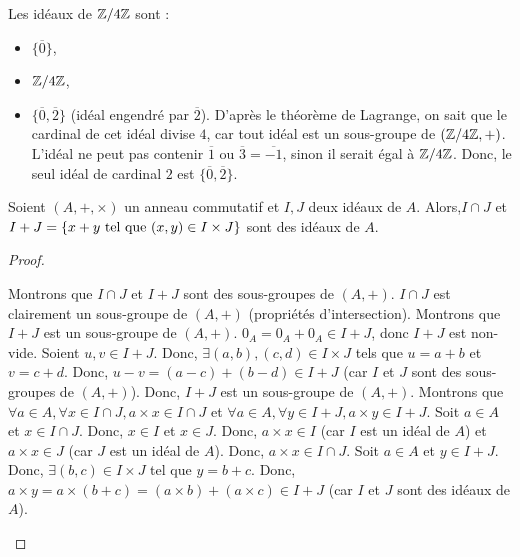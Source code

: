 \documentclass[12pt, a4paper]{report}
\begin{document}
\begin{example}
    Les idéaux de $\mathbb{Z}/4\mathbb{Z}$ sont :
    \begin{itemize}
        \item $\{\overline{0}\}$,
        \item $\mathbb{Z}/4\mathbb{Z}$,
        \item $\{\overline{0}, \overline{2}\}$ (idéal engendré par $\overline{2}$). D'après le théorème de Lagrange, on sait que le cardinal de cet idéal divise $4$, car tout idéal est un sous-groupe de $(\mathbb{Z}/4\mathbb{Z},+)$. L'idéal ne peut pas contenir $\overline{1}$ ou $\overline{3}=\overline{-1}$, sinon il serait égal à $\mathbb{Z}/4\mathbb{Z}$. Donc, le seul idéal de cardinal $2$ est $\{\overline{0}, \overline{2}\}$.
    \end{itemize}
\end{example}

\begin{property}
    Soient $(A,+,\times)$ un anneau commutatif et $I,J$ deux idéaux de $A$. Alors,$I\cap J$ et $I + J = \{x + y \text{ tel que } (x,y) \in I \times J\}$ sont des idéaux de $A$.
\end{property}

\begin{proof}
    \begin{outline}
        \1 Montrons que $I \cap J$ et $I+J$ sont des sous-groupes de $(A,+)$.
            \2 $I\cap J$ est clairement un sous-groupe de $(A,+)$ (propriétés d'intersection).
            \2 Montrons que $I + J$ est un sous-groupe de $(A,+)$.
                \3 $0_A = 0_A + 0_A \in I + J$, donc $I + J$ est non-vide.
                \3 Soient $u,v \in I + J$. Donc, $\exists (a,b), (c,d) \in I \times J$ tels que $u = a + b$ et $v = c + d$.
                \3 Donc, $u - v = (a - c) + (b - d) \in I + J$ (car $I$ et $J$ sont des sous-groupes de $(A,+)$).
            \2 Donc, $I + J$ est un sous-groupe de $(A,+)$.
        \1 Montrons que $\forall a \in A, \forall x \in I \cap J, a \times x \in I \cap J$ et $\forall a \in A, \forall y \in I + J, a \times y \in I + J$.
            \2 Soit $a \in A$ et $x \in I \cap J$. Donc, $x \in I$ et $x \in J$.
            \2 Donc, $a \times x \in I$ (car $I$ est un idéal de $A$) et $a \times x \in J$ (car $J$ est un idéal de $A$).
            \2 Donc, $a \times x \in I \cap J$.
            \2 Soit $a \in A$ et $y \in I + J$. Donc, $\exists (b,c) \in I \times J$ tel que $y = b + c$.
            \2 Donc, $a \times y = a \times (b + c) = (a \times b) + (a \times c) \in I + J$ (car $I$ et $J$ sont des idéaux de $A$).
    \end{outline}
\end{proof}
\end{document}

